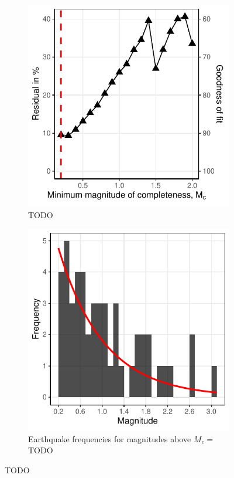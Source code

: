 \documentclass[12pt]{article}
\begin{document}
\begin{figure}[htp]
\centering
\begin{subfigure}[b]{0.49\textwidth}
    \centering
    \includegraphics[scale=1.0]{../outputs/figures/goodness-of-fit.pdf}
    \caption{TODO}
    \label{fig:goodness}
\end{subfigure}
\hfill
\begin{subfigure}[b]{0.49\textwidth}
    \centering
    \includegraphics[scale=1.0]{../outputs/figures/earthquake-histogram.pdf}
    \caption{Earthquake frequencies for magnitudes above $M_c=$ TODO}
    \label{fig:hist}
\end{subfigure}
\caption{TODO}
\label{fig:figs1}
\end{figure}
\end{document}
